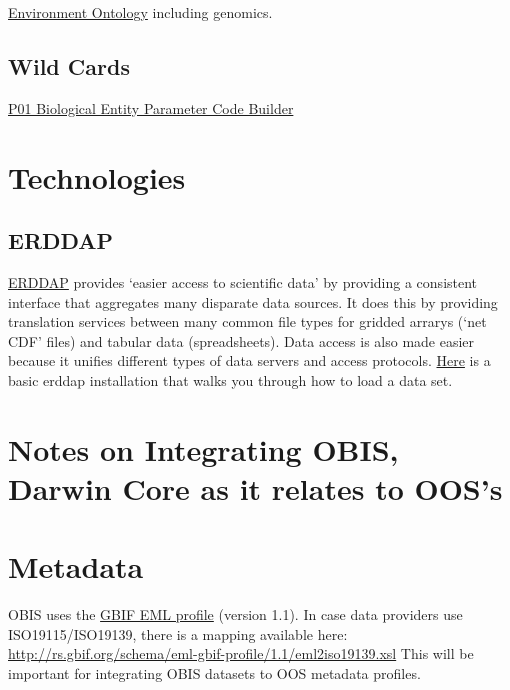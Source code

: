 \documentclass[]{book}
\begin{document}
\href{\%22http://www.obofoundry.org/ontology/envo.html\%22}{Environment Ontology} including genomics.

\hypertarget{wild-cards}{%
\subsection{Wild Cards}\label{wild-cards}}

\href{\%22https://www.bodc.ac.uk/resources/vocabularies/vocabulary_builder/biomodel/\%22}{P01 Biological Entity Parameter Code Builder}

\hypertarget{technologies}{%
\section{Technologies}\label{technologies}}

\hypertarget{erddap}{%
\subsection{ERDDAP}\label{erddap}}

\href{\%22https://coastwatch.pfeg.noaa.gov/erddap/index.html\%22}{ERDDAP} provides `easier access to scientific data' by providing a consistent interface that aggregates many disparate data sources. It does this by providing translation services between many common file types for gridded arrarys (`net CDF' files) and tabular data (spreadsheets). Data access is also made easier because it unifies different types of data servers and access protocols. \href{\%22https://github.com/HakaiInstitute/erddap-basic\%22}{Here} is a basic erddap installation that walks you through how to load a data set.

\hypertarget{notes-on-integrating-obis-darwin-core-as-it-relates-to-ooss}{%
\section{Notes on Integrating OBIS, Darwin Core as it relates to OOS's}\label{notes-on-integrating-obis-darwin-core-as-it-relates-to-ooss}}

\hypertarget{metadata}{%
\section{Metadata}\label{metadata}}

OBIS uses the \href{http://rs.gbif.org/schema/eml-gbif-profile/1.1/eml-gbif-profile.xsd}{GBIF EML profile} (version 1.1). In case data providers use ISO19115/ISO19139, there is a mapping available here: \url{http://rs.gbif.org/schema/eml-gbif-profile/1.1/eml2iso19139.xsl} This will be important for integrating OBIS datasets to OOS metadata profiles.
\end{document}
